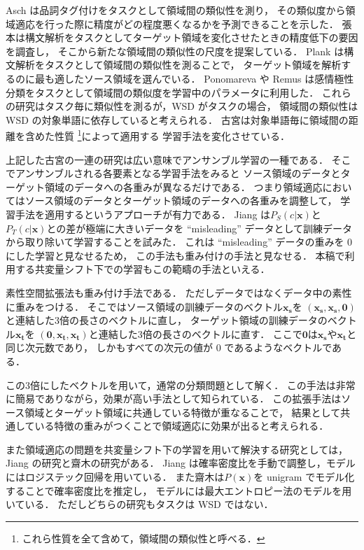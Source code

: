 \documentclass[japanese]{jnlp_1.4}
\begin{document}
Asch は品詞タグ付けをタスクとして領域間の類似性を測り，
その類似度から領域適応を行った際に精度がどの程度悪くなるかを予測できることを示した\cite{vanasch}．
張本は構文解析をタスクとしてターゲット領域を変化させたときの精度低下の要因を調査し，
そこから新たな領域間の類似性の尺度を提案している\cite{harimoto}．
Plank は構文解析をタスクとして領域間の類似性を測ることで，
ターゲット領域を解析するのに最も適したソース領域を選んでいる\cite{plank}．
Ponomareva \cite{ponomareva}や Remus \cite{rem2012}
は感情極性分類をタスクとして領域間の類似度を学習中のパラメータに利用した．
これらの研究はタスク毎に類似性を測るが，WSD がタスクの場合，
領域間の類似性は WSD の対象単語に依存していると考えられる．
古宮は対象単語毎に領域間の距離を含めた性質
\footnote{これら性質を全て含めて，領域間の類似性と呼べる．}によって適用する
学習手法を変化させている\cite{komiya3,komiya2,komiya-nlp2012}．

上記した古宮の一連の研究は広い意味でアンサンブル学習の一種である．
そこでアンサンブルされる各要素となる学習手法をみると
ソース領域のデータとターゲット領域のデータへの各重みが異なるだけである．
つまり領域適応においてはソース領域のデータとターゲット領域のデータへの各重みを調整して，
学習手法を適用するというアプローチが有力である．
Jiang \cite{jiang2007instance} は\( P_S(c|\boldsymbol{x}) \)と\( P_T(c|\boldsymbol{x}) \)との差が極端に大きいデータを
``misleading'' データとして訓練データから取り除いて学習することを試みた．
これは ``misleading'' データの重みを 0 にした学習と見なせるため，
この手法も重み付けの手法と見なせる．
本稿で利用する共変量シフト下での学習もこの範疇の手法といえる．

素性空間拡張法\cite{daume0}も重み付け手法である．
ただしデータではなくデータ中の素性に重みをつける．
そこではソース領域の訓練データのベクトル\( \boldsymbol{x_s} \)を
\( (\boldsymbol{x_s},\boldsymbol{x_s},\boldsymbol{0}) \)と連結した3倍の長さのベクトルに直し，
ターゲット領域の訓練データのベクトル\( \boldsymbol{x_t} \)を
\( (\boldsymbol{0},\boldsymbol{x_t},\boldsymbol{x_t}) \)と連結した3倍の長さのベクトルに直す．
ここで\( \boldsymbol{0} \)は\( \boldsymbol{x_s} \)や\(\boldsymbol{x_t}\)と同じ次元数であり，
しかもすべての次元の値が 0 であるようなベクトルである．

この3倍にしたベクトルを用いて，通常の分類問題として解く．
この手法は非常に簡易でありながら，効果が高い手法として知られている．
この拡張手法はソース領域とターゲット領域に共通している特徴が重なることで，
結果として共通している特徴の重みがつくことで領域適応に効果が出ると考えられる．

また領域適応の問題を共変量シフト下の学習を用いて解決する研究としては，
Jiang の研究\cite{jiang2007instance}と齋木の研究\cite{saiki-2008-03-27}がある．
Jiang は確率密度比を手動で調整し，モデルにはロジステック回帰を用いている．
また齋木は\( P(\boldsymbol{x}) \)を unigram でモデル化することで確率密度比を推定し，
モデルには最大エントロピー法のモデルを用いている．
ただしどちらの研究もタスクは WSD ではない．
\end{document}
